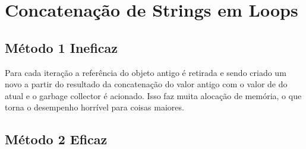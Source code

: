 \documentclass[letterpaper,10pt,brazil]{sphinxmanual}
\begin{document}
\section{Concatenação de Strings em Loops}
\label{\detokenize{content/str:concatenacao-de-strings-em-loops}}

\subsection{Método 1 \sphinxhyphen{} Ineficaz}
\label{\detokenize{content/str:metodo-1-ineficaz}}
\begin{sphinxVerbatim}[commandchars=\\\{\}]
  

   
      

\end{sphinxVerbatim}

\begin{sphinxVerbatim}[commandchars=\\\{\}]
\end{sphinxVerbatim}

Para cada iteração a referência do objeto antigo é retirada e sendo criado um novo a partir do resultado da concatenação do valor antigo com o valor de do atual e o garbage collector é acionado.
Isso faz muita alocação de memória, o que torna o desempenho horrível para coisas maiores.


\subsection{Método 2 \sphinxhyphen{} Eficaz}
\label{\detokenize{content/str:metodo-2-eficaz}}
\begin{sphinxVerbatim}[commandchars=\\\{\}]
  \PYG{p}{[}\PYG{p}{]}

   

\end{sphinxVerbatim}
\end{document}
